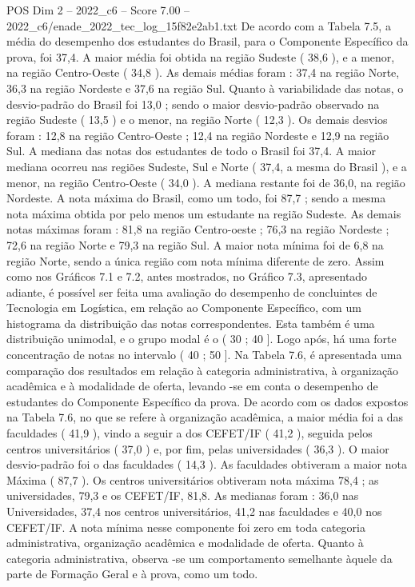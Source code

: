 \begin{textsample}{POS Dim 2 – 2022\_c6 – Score 7.00 – 2022\_c6/enade\_2022\_tec\_log\_15f82e2ab1.txt}
De acordo com a Tabela 7.5, a média do desempenho dos estudantes do Brasil, para o Componente Específico da prova, foi 37,4.
A maior média foi obtida na região Sudeste ( 38,6 ), e a menor, na região Centro-Oeste ( 34,8 ).
As demais médias foram : 37,4 na região Norte, 36,3 na região Nordeste e 37,6 na região Sul.
Quanto à variabilidade das notas, o desvio-padrão do Brasil foi 13,0 ; sendo o maior desvio-padrão observado na região Sudeste ( 13,5 ) e o menor, na região Norte ( 12,3 ).
Os demais desvios foram : 12,8 na região Centro-Oeste ; 12,4 na região Nordeste e 12,9 na região Sul.
A mediana das notas dos estudantes de todo o Brasil foi 37,4.
A maior mediana ocorreu nas regiões Sudeste, Sul e Norte ( 37,4, a mesma do Brasil ), e a menor, na região Centro-Oeste ( 34,0 ).
A mediana restante foi de 36,0, na região Nordeste.
A nota máxima do Brasil, como um todo, foi 87,7 ; sendo a mesma nota máxima obtida por pelo menos um estudante na região Sudeste.
As demais notas máximas foram : 81,8 na região Centro-oeste ; 76,3 na região Nordeste ; 72,6 na região Norte e 79,3 na região Sul.
A maior nota mínima foi de 6,8 na região Norte, sendo a única região com nota mínima diferente de zero.
Assim como nos Gráficos 7.1 e 7.2, antes mostrados, no Gráfico 7.3, apresentado adiante, é possível ser feita uma avaliação do desempenho de concluintes de Tecnologia em Logística, em relação ao Componente Específico, com um histograma da distribuição das notas correspondentes.
Esta também é uma distribuição unimodal, e o grupo modal é o ( 30 ; 40 ].
Logo após, há uma forte concentração de notas no intervalo ( 40 ; 50 ].
Na Tabela 7.6, é apresentada uma comparação dos resultados em relação à categoria administrativa, à organização acadêmica e à modalidade de oferta, levando -se em conta o desempenho de estudantes do Componente Específico da prova.
De acordo com os dados expostos na Tabela 7.6, no que se refere à organização acadêmica, a maior média foi a das faculdades ( 41,9 ), vindo a seguir a dos CEFET/IF ( 41,2 ), seguida pelos centros universitários ( 37,0 ) e, por fim, pelas universidades ( 36,3 ).
O maior desvio-padrão foi o das faculdades ( 14,3 ).
As faculdades obtiveram a maior nota Máxima ( 87,7 ).
Os centros universitários obtiveram nota máxima 78,4 ; as universidades, 79,3 e os CEFET/IF, 81,8.
As medianas foram : 36,0 nas Universidades, 37,4 nos centros universitários, 41,2 nas faculdades e 40,0 nos CEFET/IF.
A nota mínima nesse componente foi zero em toda categoria administrativa, organização acadêmica e modalidade de oferta.
Quanto à categoria administrativa, observa -se um comportamento semelhante àquele da parte de Formação Geral e à prova, como um todo.

\end{textsample}
